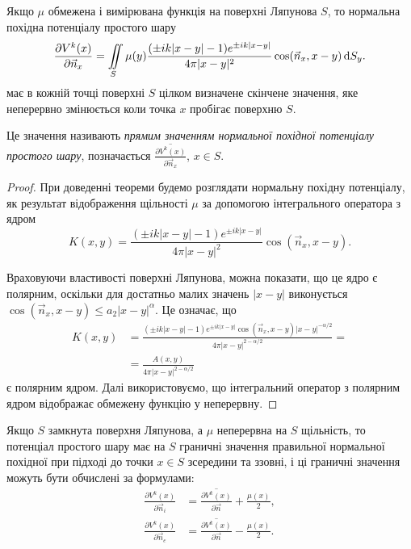 \begin{theorem}
	Якщо $\mu$ обмежена і вимірювана функція на поверхні Ляпунова $S$, то нормальна похідна потенціалу простого шару
	\begin{equation}
		\frac{\partial V^k(x)}{\partial \vec n_x} = \displaystyle\iint\limits_S \mu(y) \frac{(\pm i k |x - y| - 1) e^{\pm i k |x - y|}}{4 \pi |x - y|^2} \cos(\vec n_x, x - y) \mathop{}\!\mathrm{d} S_y.
	\end{equation}
	має в кожній точці поверхні $S$ цілком визначене скінчене значення, яке неперервно змінюється коли точка $x$ пробігає поверхню $S$.
\end{theorem}

\begin{definition}
	Це значення називають \textit{прямим значенням нормальної похідної потенціалу простого шару}, позначається $\overline{\frac{\partial V^k(x)}{\partial \vec n_x}}$, $x \in S$. 
\end{definition}

\begin{proof}
	При доведенні теореми будемо розглядати нормальну похідну потенціалу, як результат відображення щільності $\mu$ за допомогою інтегрального оператора з ядром
	\begin{equation}
		K(x, y) = \frac{(\pm i k |x - y| - 1) e^{\pm i k |x - y|}}{4 \pi |x - y|^2} \cos(\vec n_x, x - y).
	\end{equation}

	Враховуючи властивості поверхні Ляпунова, можна показати, що це ядро є полярним, оскільки для достатньо малих значень $|x - y|$ виконується $\cos(\vec n_x, x - y) \le a_2 |x - y|^\alpha$. Це означає, що
	\begin{equation}
		\begin{aligned}
			K(x, y) &= \frac{(\pm i k |x - y| - 1) e^{\pm i k |x - y|} \cos(\vec n_x, x - y) |x - y|^{-\alpha/2}}{4 \pi |x - y|^{2 - \alpha/2}} = \\
			&= \frac{A(x, y)}{4 \pi |x - y|^{2 - \alpha/2}}
		\end{aligned}
	\end{equation}
	є полярним ядром. Далі використовуємо, що інтегральний оператор з полярним ядром відображає обмежену функцію у неперервну.
\end{proof}

\begin{theorem}
	Якщо $S$ замкнута поверхня Ляпунова, а $\mu$ неперервна на $S$ щільність, то потенціал простого шару має на $S$ граничні значення правильної нормальної похідної при підході до точки $x \in S$ зсередини та ззовні, і ці граничні значення можуть бути обчислені за формулами: 
	\begin{align}
		\frac{\partial V^k(x)}{\partial \vec n_{i}} &= \overline{\frac{\partial V^k(x)}{\partial \vec n}} + \frac{\mu(x)}{2}, \\
		\frac{\partial V^k(x)}{\partial \vec n_{e}} &= \overline{\frac{\partial V^k(x)}{\partial \vec n}} - \frac{\mu(x)}{2}.
	\end{align}
\end{theorem}

